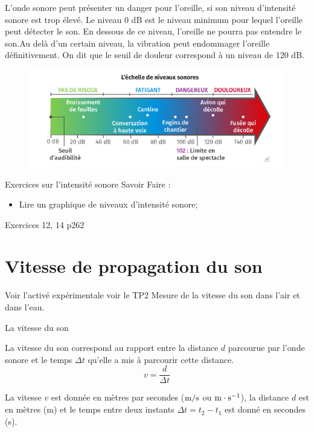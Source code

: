 \documentclass[french]{article}
\begin{document}
L'onde sonore peut présenter un danger pour l'oreille, si son niveau d'intensité sonore est trop élevé. Le niveau 0 dB est le niveau minimum pour lequel l'oreille peut détecter le son. En dessous de ce niveau, l'oreille ne pourra pas entendre le son.Au delà d'un certain niveau, la vibration peut endommager l'oreille définitivement. On dit que le seuil de douleur correspond à un niveau de 120 dB.
\begin{figure}[ht!]%
	\centering
	\includegraphics[width=.8\textwidth]{./figures/echelledesniveauxsonores.png}
\end{figure}
\begin{Exercice}{Exercices sur l'intensité sonore}
	Savoir Faire : 
	\begin{itemize}
		\item Lire un graphique de niveaux d'intensité sonore;
	\end{itemize}
	Exercices 12, 14 p262
\end{Exercice}
\clearpage
\section{Vitesse de propagation du son}
Voir l'activé expérimentale voir le TP2 \og{}Mesure de la vitesse du son dans l'air et dans l'eau\fg{}.
\begin{definition}{La vitesse du son}

	La vitesse du son correspond au rapport entre la distance $d$ parcourue par l'onde sonore et le temps $\Delta t$ qu'elle a mis à parcourir cette distance. 
\begin{equation}
	v = \dfrac{d}{\Delta t}
\end{equation}

La vitesse $v$ est donnée en mètres par secondes ($\rm m/s$ ou $\rm m\cdot s^{-1}$), la distance $d$ est en mètres (m) et le temps entre deux instants $\Delta t= t_2- t_1$ est donné en secondes (s).
\end{definition}
\end{document}
